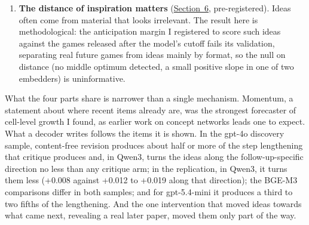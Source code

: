\documentclass[
  10pt,
]{article}
\begin{document}
\begin{enumerate}
{  continuing a paper}
  (\hyperref[sec:5]{Section~5},
  pre-registered with registered
  follow-ups). Real research starts from
  a given paper. I find that LLM
  continuations take a shorter step than
  the papers that later cited the
  source, as Tang and Yang
  (\hyperlink{ref-Tang2026}{2026})
  showed at scale, under three wordings
  of the user prompt, also after those
  papers are rewritten as proposals by
  the same model with or without the
  source in view, and, for OLMo, also
  against citing papers from 2023, just
  after its training data end; and that
  feedback lengthens the step beyond
  what revising alone does, in a
  replication on new papers. Whether
  feedback also orients the ideas is not
  resolved beyond revision: revealing
  one real follow-up's title turns
  gpt-4o's ideas towards the citing
  papers, reviewer, oracle and distance
  feedback add 0.13, 0.08 and 0.34 of
  that turn beyond revision (upper
  bounds 0.46, 0.46 and 0.70), and the
  critique arms' rise in alignment
  cannot be separated from their longer
  step.
\item
  \textbf{The distance of inspiration
  matters} (\hyperref[sec:6]{Section~6},
  pre-registered). Ideas often come from
  material that looks irrelevant. The
  result here is methodological: the
  anticipation margin I registered to
  score such ideas against the games
  released after the model's cutoff
  fails its validation, separating real
  future games from ideas mainly by
  format, so the null on distance (no
  middle optimum detected, a small
  positive slope in one of two
  embedders) is uninformative.
\end{enumerate}

What the four parts share is narrower
than a single mechanism. Momentum, a
statement about where recent items
already are, was the strongest
forecaster of cell-level growth I found,
as earlier work on concept networks
leads one to expect. What a decoder
writes follows the items it is shown. In
the gpt-4o discovery sample,
content-free revision produces about
half or more of the step lengthening
that critique produces and, in Qwen3,
turns the ideas along the
follow-up-specific direction no less
than any critique arm; in the
replication, in Qwen3, it turns them
less (+0.008 against +0.012 to +0.019
along that direction); the BGE-M3
comparisons differ in both samples; and
for gpt-5.4-mini it produces a third to
two fifths of the lengthening. And the
one intervention that moved ideas
towards what came next, revealing a real
later paper, moved them only part of the
way.
\end{document}
